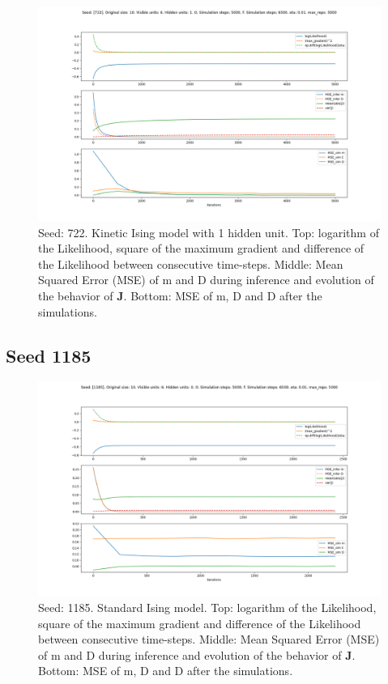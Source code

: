 \documentclass{article}
\def\*#1{\mathbf{#1}}
\begin{document}
\begin{figure}[!htb]
    \centering
    \includegraphics[width=0.7\linewidth]{images/sqrt_size/[722]_10_6_1_5000_6500_eta001_5000_100.png}
\caption{Seed: 722. Kinetic Ising model with 1 hidden unit. Top: logarithm of the Likelihood, square of the maximum gradient and difference of the Likelihood between consecutive time-steps. Middle: Mean Squared Error (MSE) of m and D during inference and evolution of the behavior of $\*J$. Bottom: MSE of m, D and D after the simulations.}
\end{figure}


\newpage
\subsection{Seed 1185}

\begin{figure}[!htb]
    \centering
    \includegraphics[width=0.8\linewidth]{images/sqrt_size/[1185]_10_6_0_5000_6500_eta001_5000_100.png}
\caption{Seed: 1185. Standard Ising model. Top: logarithm of the Likelihood, square of the maximum gradient and difference of the Likelihood between consecutive time-steps. Middle: Mean Squared Error (MSE) of m and D during inference and evolution of the behavior of $\*J$. Bottom: MSE of m, D and D after the simulations.}
\end{figure}
\end{document}
